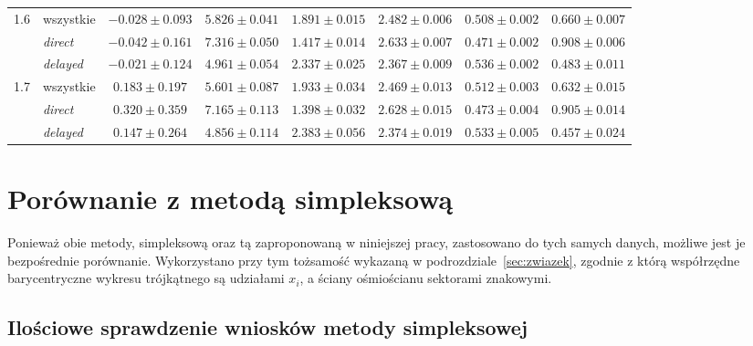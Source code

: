 \documentclass[12pt,a4paper]{article}
\begin{document}
\begin{table}[!h]
{\begin{tabular}{c l c c c c c c}
\midrule
\num{1.6} & wszystkie & $\num{-0.028}\pm\num{0.093}$ & $\num{5.826}\pm\num{0.041}$ & $\num{1.891}\pm\num{0.015}$ & $\num{2.482}\pm\num{0.006}$ & $\num{0.508}\pm\num{0.002}$ & $\num{0.660}\pm\num{0.007}$ \\
& \emph{direct} & $\num{-0.042}\pm\num{0.161}$ & $\num{7.316}\pm\num{0.050}$ & $\num{1.417}\pm\num{0.014}$ & $\num{2.633}\pm\num{0.007}$ & $\num{0.471}\pm\num{0.002}$ & $\num{0.908}\pm\num{0.006}$ \\
& \emph{delayed} & $\num{-0.021}\pm\num{0.124}$ & $\num{4.961}\pm\num{0.054}$ & $\num{2.337}\pm\num{0.025}$ & $\num{2.367}\pm\num{0.009}$ & $\num{0.536}\pm\num{0.002}$ & $\num{0.483}\pm\num{0.011}$ \\
\midrule
\num{1.7} & wszystkie & $\num{0.183}\pm\num{0.197}$ & $\num{5.601}\pm\num{0.087}$ & $\num{1.933}\pm\num{0.034}$ & $\num{2.469}\pm\num{0.013}$ & $\num{0.512}\pm\num{0.003}$ & $\num{0.632}\pm\num{0.015}$ \\
& \emph{direct} & $\num{0.320}\pm\num{0.359}$ & $\num{7.165}\pm\num{0.113}$ & $\num{1.398}\pm\num{0.032}$ & $\num{2.628}\pm\num{0.015}$ & $\num{0.473}\pm\num{0.004}$ & $\num{0.905}\pm\num{0.014}$ \\
& \emph{delayed} & $\num{0.147}\pm\num{0.264}$ & $\num{4.856}\pm\num{0.114}$ & $\num{2.383}\pm\num{0.056}$ & $\num{2.374}\pm\num{0.019}$ & $\num{0.533}\pm\num{0.005}$ & $\num{0.457}\pm\num{0.024}$ \\
\bottomrule
\end{tabular}}
\end{table}


\section{Porównanie z metodą simpleksową}
\label{sec:porownanie}

Ponieważ obie metody, simpleksową oraz tą zaproponowaną w niniejszej pracy, zastosowano do tych samych danych, możliwe jest je
bezpośrednie porównanie. Wykorzystano przy tym tożsamość wykazaną
w podrozdziale~\ref{sec:zwiazek}, zgodnie z którą współrzędne
barycentryczne wykresu trójkątnego są udziałami $x_i$, a ściany
ośmiościanu sektorami znakowymi.

\subsection{Ilościowe sprawdzenie wniosków metody simpleksowej}
\end{document}
